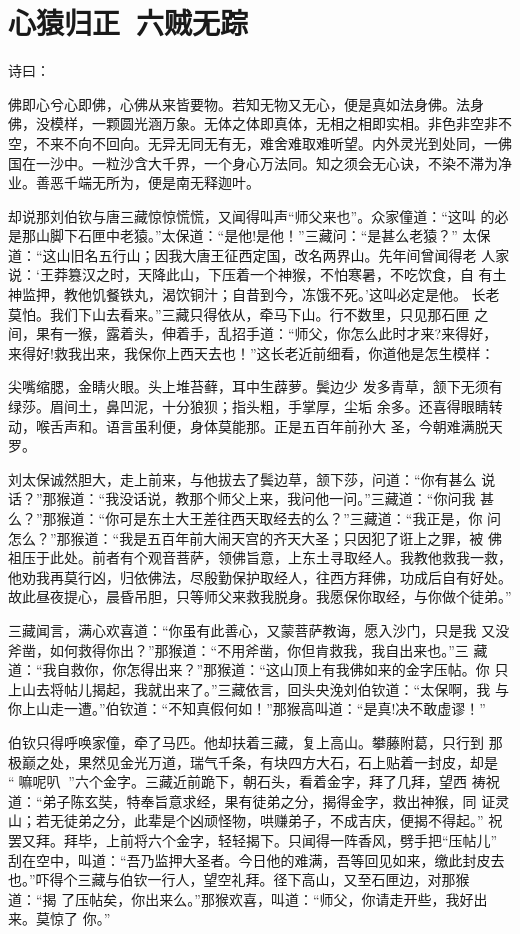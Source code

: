 \chapter{心猿归正~六贼无踪}

诗曰：

佛即心兮心即佛，心佛从来皆要物。若知无物又无心，便是真如法身佛。法身
佛，没模样，一颗圆光涵万象。无体之体即真体，无相之相即实相。非色非空非不
空，不来不向不回向。无异无同无有无，难舍难取难听望。内外灵光到处同，一佛
国在一沙中。一粒沙含大千界，一个身心万法同。知之须会无心诀，不染不滞为净
业。善恶千端无所为，便是南无释迦叶。

却说那刘伯钦与唐三藏惊惊慌慌，又闻得叫声“师父来也”。众家僮道：“这叫
的必是那山脚下石匣中老猿。”太保道：“是他!是他！”三藏问：“是甚么老猿？”
太保道：“这山旧名五行山；因我大唐王征西定国，改名两界山。先年间曾闻得老
人家说：‘王莽篡汉之时，天降此山，下压着一个神猴，不怕寒暑，不吃饮食，自
有土神监押，教他饥餐铁丸，渴饮铜汁；自昔到今，冻饿不死。’这叫必定是他。
长老莫怕。我们下山去看来。”三藏只得依从，牵马下山。行不数里，只见那石匣
之间，果有一猴，露着头，伸着手，乱招手道：“师父，你怎么此时才来?来得好，
来得好!救我出来，我保你上西天去也！”这长老近前细看，你道他是怎生模样：

尖嘴缩腮，金睛火眼。头上堆苔藓，耳中生薜萝。鬓边少
发多青草，颔下无须有绿莎。眉间土，鼻凹泥，十分狼狈；指头粗，手掌厚，尘垢
余多。还喜得眼睛转动，喉舌声和。语言虽利便，身体莫能那。正是五百年前孙大
圣，今朝难满脱天罗。

刘太保诚然胆大，走上前来，与他拔去了鬓边草，颔下莎，问道：“你有甚么
说话？”那猴道：“我没话说，教那个师父上来，我问他一问。”三藏道：“你问我
甚么？”那猴道：“你可是东土大王差往西天取经去的么？”三藏道：“我正是，你
问怎么？”那猴道：“我是五百年前大闹天宫的齐天大圣；只因犯了诳上之罪，被
佛祖压于此处。前者有个观音菩萨，领佛旨意，上东土寻取经人。我教他救我一救，
他劝我再莫行凶，归依佛法，尽殷勤保护取经人，往西方拜佛，功成后自有好处。
故此昼夜提心，晨昏吊胆，只等师父来救我脱身。我愿保你取经，与你做个徒弟。”

三藏闻言，满心欢喜道：“你虽有此善心，又蒙菩萨教诲，愿入沙门，只是我
又没斧凿，如何救得你出？”那猴道：“不用斧凿，你但肯救我，我自出来也。”三
藏道：“我自救你，你怎得出来？”那猴道：“这山顶上有我佛如来的金字压帖。你
只上山去将帖儿揭起，我就出来了。”三藏依言，回头央浼刘伯钦道：“太保啊，我
与你上山走一遭。”伯钦道：“不知真假何如！”那猴高叫道：“是真!决不敢虚谬！”

伯钦只得呼唤家僮，牵了马匹。他却扶着三藏，复上高山。攀藤附葛，只行到
那极巅之处，果然见金光万道，瑞气千条，有块四方大石，石上贴着一封皮，却是
“嘛呢叭”六个金字。三藏近前跪下，朝石头，看着金字，拜了几拜，望西
祷祝道：“弟子陈玄奘，特奉旨意求经，果有徒弟之分，揭得金字，救出神猴，同
证灵山；若无徒弟之分，此辈是个凶顽怪物，哄赚弟子，不成吉庆，便揭不得起。”
祝罢又拜。拜毕，上前将六个金字，轻轻揭下。只闻得一阵香风，劈手把“压帖儿”
刮在空中，叫道：“吾乃监押大圣者。今日他的难满，吾等回见如来，缴此封皮去
也。”吓得个三藏与伯钦一行人，望空礼拜。径下高山，又至石匣边，对那猴道：“揭
了压帖矣，你出来么。”那猴欢喜，叫道：“师父，你请走开些，我好出来。莫惊了
你。”

